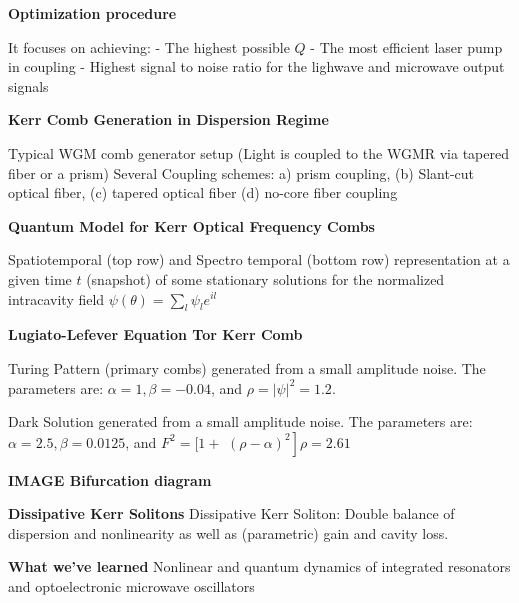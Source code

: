 \documentclass[main.tex]{subfiles}
\begin{document}
\textbf{Optimization procedure}

It focuses on achieving:
- The highest possible $Q$
- The most efficient laser pump in coupling
- Highest signal to noise ratio for the lighwave and microwave output signals

\textbf{Kerr Comb Generation in Dispersion Regime}

Typical WGM comb generator setup (Light is coupled to the WGMR via tapered fiber or a prism)
Several Coupling schemes: a) prism coupling, (b) Slant-cut optical fiber, (c) tapered optical fiber (d) no-core fiber coupling

\textbf{Quantum Model for Kerr Optical Frequency Combs}

Spatiotemporal (top row) and Spectro temporal (bottom row) representation at a given time $t$ (snapshot) of some stationary solutions for the normalized intracavity field $\psi(\theta)=\sum_l \psi_l e^{i l}$

\textbf{Lugiato-Lefever Equation Tor Kerr Comb}

Turing Pattern (primary combs) generated from a small amplitude noise. The parameters are: $\alpha=1, \beta=-0.04$, and $\rho=|\psi|^2=1.2$.

Dark Solution generated from a small amplitude noise. The parameters are: $\alpha=2.5, \beta=0.0125$, and $F^2=[1+$ $\left.(\rho-\alpha)^2\right] \rho=2.61$

\textbf{IMAGE Bifurcation diagram}

\textbf{Dissipative Kerr Solitons}
Dissipative Kerr Soliton: Double balance of dispersion and nonlinearity as well as (parametric) gain and cavity loss.

\textbf{What we've learned}
Nonlinear and quantum dynamics of integrated resonators and optoelectronic microwave oscillators
\end{document}
